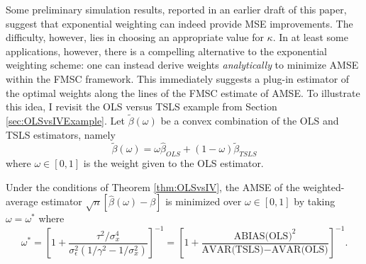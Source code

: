 Some preliminary simulation results, reported in an earlier draft of this paper, suggest that exponential weighting can indeed provide MSE improvements.
The difficulty, however, lies in choosing an appropriate value for $\kappa$.
In at least some applications, however, there is a compelling alternative to the exponential weighting scheme: one can instead derive weights \emph{analytically} to minimize AMSE within the FMSC framework.
This immediately suggests a plug-in estimator of the optimal weights along the lines of the FMSC estimate of AMSE.
To illustrate this idea, I revisit the OLS versus TSLS example from Section \ref{sec:OLSvsIVExample}.
Let $\widetilde{\beta}(\omega)$ be a convex combination of the OLS and TSLS estimators, namely  
\begin{equation}
	\widetilde{\beta}(\omega) = \omega \widehat{\beta}_{OLS} + (1 - \omega) \widetilde{\beta}_{TSLS}
\end{equation}
where $\omega \in [0,1]$ is the weight given to the OLS estimator.
\begin{thm}
	\label{thm:OLSvsIVavg} 
	Under the conditions of Theorem \ref{thm:OLSvsIV}, the AMSE of the weighted-average estimator $\sqrt{n}\left[\widehat{\beta}(\omega) - \beta \right]$ is minimized over $\omega \in [0,1]$ by taking $\omega = \omega^*$ where
	$$ \omega^* = \left[1 + \frac{\tau^2/\sigma_x^4}{\sigma_\epsilon^2(1/\gamma^2 - 1/\sigma_x^2)}\right]^{-1} = \left[1 + \frac{\mbox{ABIAS(OLS)}^2}{\mbox{AVAR(TSLS)}-\mbox{AVAR(OLS)}} \right]^{-1}.$$
\end{thm}

